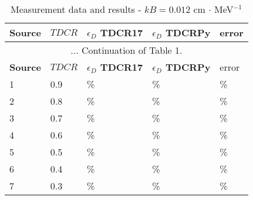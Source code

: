 \documentclass[12pt]{iopart}
\begin{document}
\begingroup
\footnotesize
\begin{longtable}[l]{| p{} | p{} |p{} |p{} |p{} |} 
\caption{Measurement data and results - $kB = 0.012$ cm $\cdot$ MeV$^{-1}$}
\label{Table1} \\ 
\hline
\textbf{Source} & \textbf{$TDCR$} & \textbf{$\epsilon_{D}$ TDCR17} & \textbf{$\epsilon_{D}$ TDCRPy} & error \\ 
\endfirsthead
\multicolumn{5}{c}{... Continuation of Table 1.}\\ 
\hline
 \textbf{Source} & \textbf{$TDCR$} & \textbf{$\epsilon_{D}$ TDCR17} & \textbf{$\epsilon_{D}$ TDCRPy} & error \\   \hline 
\endhead
\hline
 1 & 0.9   &    \% &    \% &  \% \\
 2 & 0.8   &    \% &    \% &  \% \\
 3 & 0.7   &    \% &    \% &  \% \\
 4 & 0.6   &    \% &    \% &  \% \\
 5 & 0.5   &    \% &    \% &  \% \\
 6 & 0.4   &    \% &    \% &  \% \\
 7 & 0.3   &    \% &    \% &  \% \\
\hline
\end{longtable} 
\endgroup
\end{document}
